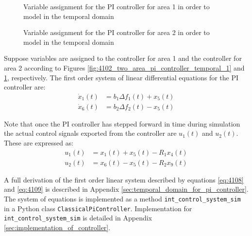 \begin{figure}[h]
	\begin{minipage}[b]{0.5\textwidth}
		\resizebox{7.0cm}{!}{}
		\caption[Area 1 PI controller ODE derivation]{Variable assignment for the PI controller for area 1 in order to model in the temporal domain}
		\label{fig:4102_two_area_pi_controller_temporal_1}
	\end{minipage}
	\hspace{0.1cm}
	\begin{minipage}[b]{0.5\textwidth}
		\resizebox{7.2cm}{!}{}
		\caption[Area 2 PI controller ODE derivation]{Variable assignment for the PI controller for area 2 in order to model in the temporal domain}
		\label{fig:4103_two_area_pi_controller_temporal_2}
	\end{minipage}
\end{figure}

Suppose variables are assigned to the controller for area 1 and the controller for area 2 according to Figures \ref{fig:4102_two_area_pi_controller_temporal_1} and \ref{fig:4103_two_area_pi_controller_temporal_2}, respectively. The first order system of linear differential equations for the PI controller are:
\begin{align}
	\dot{x}_1(t) &= b_1 \Delta f_1(t) + x_5(t) \label{eq:4108} \\
	\dot{x}_6(t) &= b_2 \Delta f_2(t) - x_5(t) \label{eq:4109}
\end{align}

Note that once the PI controller has stepped forward in time during simulation the actual control signals exported from the controller are $u_1(t)$ and $u_2(t)$. These are expressed as:
\begin{align}
	u_1(t) &= x_1(t) + x_5(t) - R_1 x_4(t) \\
	u_2(t) &= x_6(t) - x_5(t) - R_2 x_9(t) 
\end{align}

A full derivation of the first order linear system described by equations \ref{eq:4108} and \ref{eq:4109} is described in Appendix \ref{sec:temporal_domain_for_pi_controller}. The system of equations is implemented as a method \verb|int_control_system_sim| in a Python class \verb|ClassicalPiController|. Implementation for \verb|int_control_system_sim| is detailed in Appendix \ref{sec:implementation_of_controller}.

